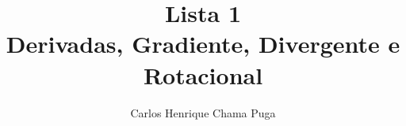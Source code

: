\documentclass[a4paper, 12pt]{article}
\numberwithin{equation}{section}
\begin{document}
\author{Carlos Henrique Chama Puga}
\newcommand{\RA}{195416}

\title{Lista 1 \\ Derivadas, Gradiente, Divergente e Rotacional}

\newcommand{\Uni}{{Universidade Estadual de Campinas}}
\newcommand{\Fac}{{Faculdade de Engenharia Civil, Arquitetura e Urbanismo}}

\newcommand{\advisor}{Porf. Dr. Philippe Devloo}
\newcommand{\coadvisor}{Dr. Giovane Avancini}

\newcommand*{\workyear}{2024}

\makeatletter


\pagestyle{plain}

\newpage
\tableofcontents 

\newpage
{}


\pagestyle{headings}










\appendix

\end{document}
